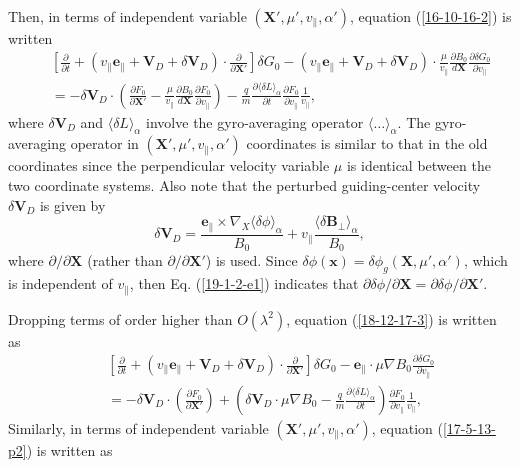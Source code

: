 \documentclass{article}
\begin{document}
Then, in terms of independent variable $(\mathbf{X}', \mu', v_{\parallel},
\alpha')$, equation (\ref{16-10-16-2}) is written
\begin{eqnarray}
  &  & \left[ \frac{\partial}{\partial t} + (v_{\parallel}
  \mathbf{e}_{\parallel} +\mathbf{V}_D + \delta \mathbf{V}_D) \cdot
  \frac{\partial}{\partial \mathbf{X}'} \right] \delta G_0 - (v_{\parallel}
  \mathbf{e}_{\parallel} +\mathbf{V}_D + \delta \mathbf{V}_D) \cdot
  \frac{\mu}{v_{\parallel}}  \frac{\partial B_0}{d\mathbf{X}} \frac{\partial
  \delta G_0}{\partial v_{\parallel}} \nonumber\\
  &  & = - \delta \mathbf{V}_D \cdot \left( \frac{\partial F_0}{\partial
  \mathbf{X}'} - \frac{\mu}{v_{\parallel}}  \frac{\partial B_0}{d\mathbf{X}}
  \frac{\partial F_0}{\partial v_{\parallel}} \right) - \frac{q}{m} 
  \frac{\partial \langle \delta L \rangle_{\alpha}}{\partial t} 
  \frac{\partial F_0}{\partial v_{\parallel}}  \frac{1}{v_{\parallel}}, 
  \label{18-12-17-3}
\end{eqnarray}
where $\delta \mathbf{V}_D$ and $\langle \delta L \rangle_{\alpha}$ involve
the gyro-averaging operator $\langle \ldots \rangle_{\alpha}$. The
gyro-averaging operator in $(\mathbf{X}', \mu', v_{\parallel}, \alpha')$
coordinates is similar to that in the old coordinates since the perpendicular
velocity variable $\mu$ is identical between the two coordinate systems. Also
note that the perturbed guiding-center velocity $\delta \mathbf{V}_D$ is given
by
\begin{equation}
  \delta \mathbf{V}_D = \frac{\mathbf{e}_{\parallel} \times \nabla_X \langle
  \delta \phi \rangle_{\alpha}}{B_0} + v_{\parallel} \frac{\langle \delta
  \mathbf{B}_{\perp} \rangle_{\alpha}}{B_0},
\end{equation}
where $\partial / \partial \mathbf{X}$ (rather than $\partial / \partial
\mathbf{X}'$) is used. Since $\delta \phi (\mathbf{x}) = \delta \phi_g
(\mathbf{X}, \mu', \alpha')$, which is independent of $v_{\parallel}$, then
Eq. (\ref{19-1-2-e1}) indicates that $\partial \delta \phi / \partial
\mathbf{X}= \partial \delta \phi / \partial \mathbf{X}'$.

Dropping terms of order higher than $O (\lambda^2)$, equation
(\ref{18-12-17-3}) is written as
\begin{eqnarray}
  &  & \left[ \frac{\partial}{\partial t} + (v_{\parallel}
  \mathbf{e}_{\parallel} +\mathbf{V}_D + \delta \mathbf{V}_D) \cdot
  \frac{\partial}{\partial \mathbf{X}'} \right] \delta G_0
  -\mathbf{e}_{\parallel} \cdot \mu \nabla B_0 \frac{\partial \delta
  G_0}{\partial v_{\parallel}} \nonumber\\
  &  & = - \delta \mathbf{V}_D \cdot \left( \frac{\partial F_0}{\partial
  \mathbf{X}'} \right) + \left( \delta \mathbf{V}_D \cdot \mu \nabla B_0 -
  \frac{q}{m}  \frac{\partial \langle \delta L \rangle_{\alpha}}{\partial t}
  \right)  \frac{\partial F_0}{\partial v_{\parallel}} 
  \frac{1}{v_{\parallel}}, 
\end{eqnarray}
Similarly, in terms of independent variable $(\mathbf{X}', \mu',
v_{\parallel}, \alpha')$, equation (\ref{17-5-13-p2}) is written as
\end{document}

